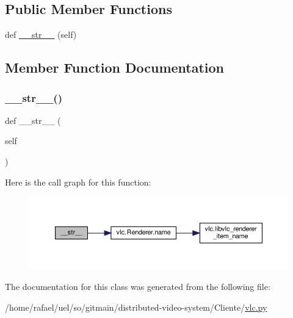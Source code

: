 \subsection*{Public Member Functions}
\begin{DoxyCompactItemize}
\item 
def \hyperlink{classvlc_1_1_media_discoverer_description_a23e8041ce1015febe4fdace3225714f9}{\+\_\+\+\_\+str\+\_\+\+\_\+} (self)
\end{DoxyCompactItemize}


\subsection{Member Function Documentation}
\mbox{\label{classvlc_1_1_media_discoverer_description_a23e8041ce1015febe4fdace3225714f9}} 
\subsubsection{\texorpdfstring{\+\_\+\+\_\+str\+\_\+\+\_\+()}{\_\_str\_\_()}}
{\footnotesize\ttfamily def \+\_\+\+\_\+str\+\_\+\+\_\+ (\begin{DoxyParamCaption}\item[{}]{self }\end{DoxyParamCaption})}

Here is the call graph for this function\+:
\nopagebreak
\begin{figure}[H]
\begin{center}
\leavevmode
\includegraphics[width=350pt]{classvlc_1_1_media_discoverer_description_a23e8041ce1015febe4fdace3225714f9_cgraph}
\end{center}
\end{figure}


The documentation for this class was generated from the following file\+:\begin{DoxyCompactItemize}
\item 
/home/rafael/uel/so/gitmain/distributed-\/video-\/system/\+Cliente/\hyperlink{vlc_8py}{vlc.\+py}\end{DoxyCompactItemize}
